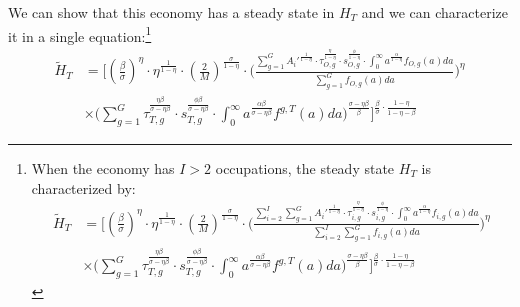 \documentclass[onehalfspacing,11pt]{article}
\begin{document}
	We can show that this economy has a steady state in $H_T$ and we can characterize it in a single equation:\footnote{When the economy has $I>2$ occupations, the steady state $H_T$ is characterized by:
		\begin{align*}
			\widetilde{H}_{T} & = \Bigg[ \left(\tfrac{\beta}{\sigma}\right)^\eta \cdot\eta^{\frac{1}{1-\eta}} \cdot \left(\tfrac{2}{M}\right)^{\frac{\sigma}{1-\eta}} \cdot \Bigg( \frac{\sum_{i=2}^I \sum_{g=1}^G {A_i'}^\frac{1}{1-\eta}\cdot\tau_{i,g}^\frac{\eta}{1-\eta} \cdot s_{i,g}^\frac{\phi}{1-\eta}\cdot \int_0^\infty a^{\frac{\alpha}{1-\eta}} f_{i,g}(a)da}{\sum_{i=2}^I \sum_{g=1}^G f_{i,g}(a)da} \Bigg)^\eta \nonumber\\
			& \times \Bigg(\sum_{g=1}^G \tau_{T,g}^\frac{\eta\beta }{\sigma-\eta\beta } \cdot s_{T,g}^\frac{\phi\beta }{\sigma-\eta\beta } \cdot \int_0^\infty a^\frac{\alpha\beta}{\sigma-\eta\beta } f^{g,T}(a)da \Bigg)^\frac{\sigma-\eta\beta}{\beta} \Bigg]^{\frac{\beta}{\sigma}\cdot\frac{1-\eta}{1-\eta-\beta}}
		\end{align*}
	}
	\begin{align}
		\widetilde{H}_{T} & = \Bigg[ \left(\tfrac{\beta}{\sigma}\right)^\eta \cdot\eta^{\frac{1}{1-\eta}} \cdot \left(\tfrac{2}{M}\right)^{\frac{\sigma}{1-\eta}} \cdot \Bigg( \frac{\sum_{g=1}^G {A_i'}^\frac{1}{1-\eta}\cdot\tau_{O,g}^\frac{\eta}{1-\eta} \cdot s_{O,g}^\frac{\phi}{1-\eta}\cdot \int_0^\infty a^{\frac{\alpha}{1-\eta}} f_{O,g}(a)da}{\sum_{g=1}^G f_{O,g}(a)da} \Bigg)^\eta \nonumber\\
		& \times \Bigg(\sum_{g=1}^G \tau_{T,g}^\frac{\eta\beta }{\sigma-\eta\beta } \cdot s_{T,g}^\frac{\phi\beta }{\sigma-\eta\beta } \cdot \int_0^\infty a^\frac{\alpha\beta}{\sigma-\eta\beta } f^{g,T}(a)da \Bigg)^\frac{\sigma-\eta\beta}{\beta} \Bigg]^{\frac{\beta}{\sigma}\cdot\frac{1-\eta}{1-\eta-\beta}}
	\end{align}
\end{document}
